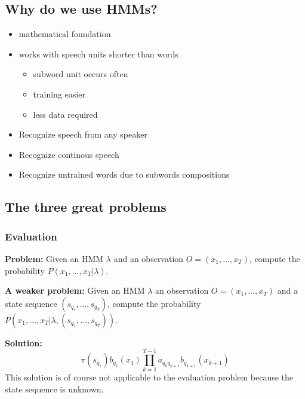 \subsection{Why do we use HMMs?}
\begin{itemize}
\item mathematical foundation
\item works with speech units shorter than words
\begin{itemize}
\item subword unit occurs often
\item training easier
\item less data required
\end{itemize}
\item Recognize speech from any speaker
\item Recognize continous speech
\item Recognize untrained words due to subwords compositions

\end{itemize}


\subsection{The three great problems}

\subsubsection{Evaluation}

\textbf{Problem:} Given an HMM $\lambda$ and an observation $O = (x_1, \ldots, x_T)$, compute the probability $P(x_1, \ldots, x_T | \lambda)$.

\vspace{10pt}

\textbf{A weaker problem:} Given an HMM $\lambda$ an observation $O = (x_1, \ldots, x_T)$ and a state sequence $(s_{q_i}, \ldots, s_{q_T})$, compute the probability $P(x_1, \ldots, x_T | \lambda, (s_{q_1}, \ldots, s_{q_T}))$.

\vspace{5pt}

\textbf{Solution:}
\begin{equation}
    \pi(s_{q_1}) b_{q_1}(x_1) \prod\limits_{k = 1}^{T - 1} a_{q_{k}q_{k+1}} b_{q_{k+1}}(x_{k+1})
\end{equation}
This solution is of course not applicable to the evaluation problem because the state sequence is unknown.

\vspace{10pt}

